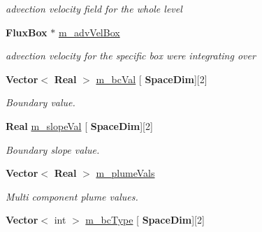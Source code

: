 \begin{DoxyCompactItemize}
\begin{DoxyCompactList}\small\item\em advection velocity field for the whole level \end{DoxyCompactList}\item 
\mbox{\label{class_advect_i_b_c_a34ee29705f4f1205a75f0c725a135a1a}} 
\textbf{ Flux\+Box} $\ast$ \hyperlink{class_advect_i_b_c_a34ee29705f4f1205a75f0c725a135a1a}{m\+\_\+adv\+Vel\+Box}
\begin{DoxyCompactList}\small\item\em advection velocity for the specific box we\textquotesingle{}re integrating over \end{DoxyCompactList}\item 
\mbox{\label{class_advect_i_b_c_a8d828241433e76c184521c9ae489f078}} 
\textbf{ Vector}$<$ \textbf{ Real} $>$ \hyperlink{class_advect_i_b_c_a8d828241433e76c184521c9ae489f078}{m\+\_\+bc\+Val} \mbox{[}\textbf{ Space\+Dim}\mbox{]}\mbox{[}2\mbox{]}
\begin{DoxyCompactList}\small\item\em Boundary value. \end{DoxyCompactList}\item 
\mbox{\label{class_advect_i_b_c_a4f7653572eab6fea3ad343517b9f87c6}} 
\textbf{ Real} \hyperlink{class_advect_i_b_c_a4f7653572eab6fea3ad343517b9f87c6}{m\+\_\+slope\+Val} \mbox{[}\textbf{ Space\+Dim}\mbox{]}\mbox{[}2\mbox{]}
\begin{DoxyCompactList}\small\item\em Boundary slope value. \end{DoxyCompactList}\item 
\mbox{\label{class_advect_i_b_c_a690ab64b62ebfc1757ec94dc93706516}} 
\textbf{ Vector}$<$ \textbf{ Real} $>$ \hyperlink{class_advect_i_b_c_a690ab64b62ebfc1757ec94dc93706516}{m\+\_\+plume\+Vals}
\begin{DoxyCompactList}\small\item\em Multi component plume values. \end{DoxyCompactList}\item 
\mbox{\label{class_advect_i_b_c_aa2a891f499c8d490a7ac7531a33a5d85}} 
\textbf{ Vector}$<$ int $>$ \hyperlink{class_advect_i_b_c_aa2a891f499c8d490a7ac7531a33a5d85}{m\+\_\+bc\+Type} \mbox{[}\textbf{ Space\+Dim}\mbox{]}\mbox{[}2\mbox{]}

\end{DoxyCompactItemize}
